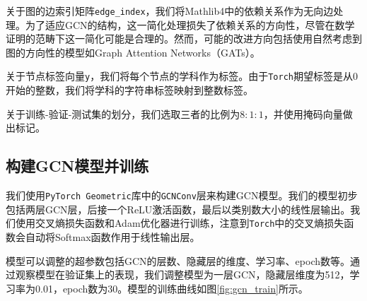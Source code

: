 关于图的边索引矩阵\texttt{edge\_index}，我们将Mathlib4中的依赖关系作为无向边处理。为了适应GCN的结构，这一简化处理损失了依赖关系的方向性，尽管在数学证明的范畴下这一简化可能是合理的。然而，可能的改进方向包括使用自然考虑到图的方向性的模型如Graph Attention Networks（GATs）。

关于节点标签向量\texttt{y}，我们将每个节点的学科作为标签。由于\texttt{Torch}期望标签是从0开始的整数，我们将学科的字符串标签映射到整数标签。

关于训练-验证-测试集的划分，我们选取三者的比例为$8:1:1$，并使用掩码向量做出标记。

\subsection{构建GCN模型并训练}
我们使用\texttt{PyTorch Geometric}库中的\texttt{GCNConv}层来构建GCN模型。我们的模型初步包括两层GCN层，后接一个ReLU激活函数，最后以类别数大小的线性层输出。我们使用交叉熵损失函数和Adam优化器进行训练，注意到\texttt{Torch}中的交叉熵损失函数会自动将Softmax函数作用于线性输出层。

模型可以调整的超参数包括GCN的层数、隐藏层的维度、学习率、epoch数等。通过观察模型在验证集上的表现，我们调整模型为一层GCN，隐藏层维度为512，学习率为0.01，epoch数为30。模型的训练曲线如图\ref{fig:gcn_train}所示。%

